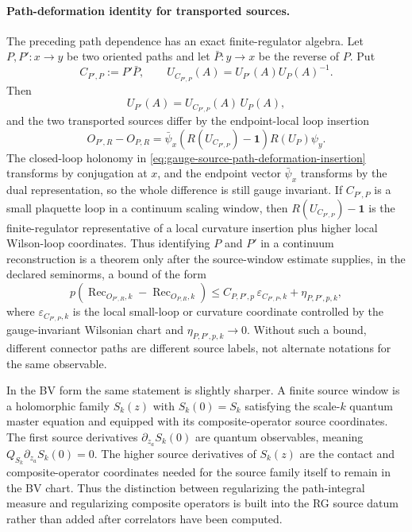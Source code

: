 \paragraph{Path-deformation identity for transported sources.}
The preceding path dependence has an exact finite-regulator algebra.  Let
\(P,P':x\to y\) be two oriented paths and let \(\bar P:y\to x\) be the
reverse of \(P\).  Put
\[
  C_{P',P}:=P'\bar P ,
  \qquad
  U_{C_{P',P}}(A)=U_{P'}(A)U_P(A)^{-1}.
\]
Then
\begin{equation}
  U_{P'}(A)=U_{C_{P',P}}(A)\,U_P(A),
  \label{eq:gauge-source-path-deformation-holonomy}
\end{equation}
and the two transported sources differ by the endpoint-local loop insertion
\begin{equation}
  O_{P',R}-O_{P,R}
  =
  \bar\psi_x
  \left(
    R(U_{C_{P',P}})-\mathbf 1
  \right)
  R(U_P)\psi_y .
  \label{eq:gauge-source-path-deformation-insertion}
\end{equation}
The closed-loop holonomy in
\eqref{eq:gauge-source-path-deformation-insertion} transforms by conjugation
at \(x\), and the endpoint vector \(\bar\psi_x\) transforms by the dual
representation, so the whole difference is still gauge invariant.  If
\(C_{P',P}\) is a small plaquette loop in a continuum scaling window, then
\(R(U_{C_{P',P}})-\mathbf1\) is the finite-regulator representative of a
local curvature insertion plus higher local Wilson-loop coordinates.  Thus
identifying \(P\) and \(P'\) in a continuum reconstruction is a theorem only
after the source-window estimate supplies, in the declared seminorms, a bound
of the form
\begin{equation}
  p\!\left(
    \operatorname{Rec}_{O_{P',R},k}
    -
    \operatorname{Rec}_{O_{P,R},k}
  \right)
  \leq
  C_{P,P',p}\,\varepsilon_{C_{P',P},k}
  +
  \eta_{P,P',p,k},
  \label{eq:gauge-source-path-deformation-reconstruction-bound}
\end{equation}
where \(\varepsilon_{C_{P',P},k}\) is the local small-loop or curvature
coordinate controlled by the gauge-invariant Wilsonian chart and
\(\eta_{P,P',p,k}\to0\).  Without such a bound, different connector paths are
different source labels, not alternate notations for the same observable.

In the BV form the same statement is slightly sharper.  A finite source
window is a holomorphic family \(S_k(z)\) with \(S_k(0)=S_k\) satisfying the
scale-\(k\) quantum master equation and equipped with its composite-operator
source coordinates.  The first source derivatives
\(\partial_{z_a}S_k(0)\) are quantum observables, meaning
\(Q_{S_k}\partial_{z_a}S_k(0)=0\).  The higher source derivatives of
\(S_k(z)\) are the contact and composite-operator coordinates needed for the
source family itself to remain in the BV chart.  Thus the distinction between
regularizing the path-integral measure and regularizing composite
operators is built into the RG source datum rather than added after
correlators have been computed.

